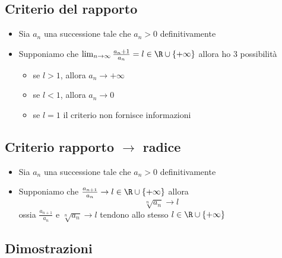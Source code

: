 \subsection{Criterio del rapporto}
\begin{itemize}
	\item Sia $a_n$ una successione tale che $a_n > 0$ definitivamente
	\item Supponiamo che $\lim_{n \to \infty} \frac{a_n+1}{a_n}=l \in  \R \cup    \left\{ +\infty \right\} $
	      allora ho 3 possibilità
	      \begin{itemize}
		      \item se $l > 1$, allora $ a_n \to +\infty$
		      \item se $l < 1$, allora $a_n \to 0$
		      \item se  $l=1$ il criterio non fornisce informazioni
	      \end{itemize}
\end{itemize}
\subsection{Criterio rapporto $ \rightarrow $ radice}
\begin{itemize}
	\item Sia $a_n$ una successione tale che $a_n > 0 $ definitivamente
	\item Supponiamo che $\frac{a_{n + 1}}{a_n} \to l \in  \R \cup \left\{ +\infty \right\} $
	      allora
	      \[
		      \sqrt[n]{a_n} \to l
	      \]
	      ossia $\frac{a_{n +1}}{a_n}$ e $\sqrt[n]{a_n} \to l$ tendono allo stesso $l \in \R \cup \left\{ +\infty \right\} $
\end{itemize}
\subsection{Dimostrazioni}
